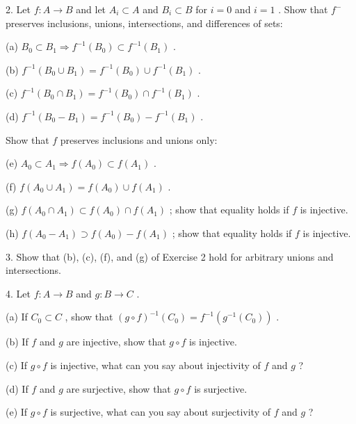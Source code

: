 2. Let \(f : A \rightarrow  B\) and let \({A}_{i} \subset  A\) and \({B}_{i} \subset  B\) for \(i = 0\) and \(i = 1\) . Show that \({f}^{ - }\) preserves inclusions, unions, intersections, and differences of sets:

(a) \({B}_{0} \subset  {B}_{1} \Rightarrow  {f}^{-1}\left( {B}_{0}\right)  \subset  {f}^{-1}\left( {B}_{1}\right)\) .

(b) \({f}^{-1}\left( {{B}_{0} \cup  {B}_{1}}\right)  = {f}^{-1}\left( {B}_{0}\right)  \cup  {f}^{-1}\left( {B}_{1}\right)\) .

(c) \({f}^{-1}\left( {{B}_{0} \cap  {B}_{1}}\right)  = {f}^{-1}\left( {B}_{0}\right)  \cap  {f}^{-1}\left( {B}_{1}\right)\) .

(d) \({f}^{-1}\left( {{B}_{0} - {B}_{1}}\right)  = {f}^{-1}\left( {B}_{0}\right)  - {f}^{-1}\left( {B}_{1}\right)\) .

Show that \(f\) preserves inclusions and unions only:

(e) \({A}_{0} \subset  {A}_{1} \Rightarrow  f\left( {A}_{0}\right)  \subset  f\left( {A}_{1}\right)\) .

(f) \(f\left( {{A}_{0} \cup  {A}_{1}}\right)  = f\left( {A}_{0}\right)  \cup  f\left( {A}_{1}\right)\) .

(g) \(f\left( {{A}_{0} \cap  {A}_{1}}\right)  \subset  f\left( {A}_{0}\right)  \cap  f\left( {A}_{1}\right)\) ; show that equality holds if \(f\) is injective.

(h) \(f\left( {{A}_{0} - {A}_{1}}\right)  \supset  f\left( {A}_{0}\right)  - f\left( {A}_{1}\right)\) ; show that equality holds if \(f\) is injective.

3. Show that (b), (c), (f), and (g) of Exercise 2 hold for arbitrary unions and intersections.

4. Let \(f : A \rightarrow  B\) and \(g : B \rightarrow  C\) .

(a) If \({C}_{0} \subset  C\) , show that \({\left( g \circ  f\right) }^{-1}\left( {C}_{0}\right)  = {f}^{-1}\left( {{g}^{-1}\left( {C}_{0}\right) }\right)\) .

(b) If \(f\) and \(g\) are injective, show that \(g \circ  f\) is injective.

(c) If \(g \circ  f\) is injective, what can you say about injectivity of \(f\) and \(g\) ?

(d) If \(f\) and \(g\) are surjective, show that \(g \circ  f\) is surjective.

(e) If \(g \circ  f\) is surjective, what can you say about surjectivity of \(f\) and \(g\) ?

